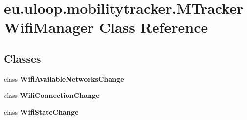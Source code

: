 \hypertarget{classeu_1_1uloop_1_1mobilitytracker_1_1MTrackerWifiManager}{\section{eu.\+uloop.\+mobilitytracker.\+M\+Tracker\+Wifi\+Manager Class Reference}
\label{classeu_1_1uloop_1_1mobilitytracker_1_1MTrackerWifiManager}
}
\subsection*{Classes}
\begin{DoxyCompactItemize}
\item 
class {\bfseries Wifi\+Available\+Networks\+Change}
\item 
class {\bfseries Wifi\+Connection\+Change}
\item 
class {\bfseries Wifi\+State\+Change}
\end{DoxyCompactItemize}
